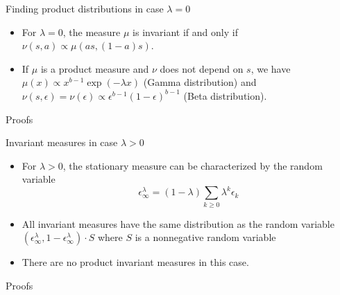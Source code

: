 \documentclass[9pt]{beamer}
\begin{document}
\begin{frame}{Finding product distributions in case $\lambda = 0$}
\begin{itemize}
    \item For $\lambda = 0$, the measure $\mu$ is invariant if and only if $\nu(s, a) \propto \mu(as, (1-a)s)$.
    \item If $\mu$ is a product measure and $\nu$ does not depend on $s$, we have $\mu(x) \propto x^{b-1} \exp(-\lambda x)$ (Gamma distribution) and $\nu(s, \epsilon) = \nu(\epsilon) \propto \epsilon^{b-1}(1-\epsilon)^{b-1}$ (Beta distribution).
\end{itemize}
\end{frame}


\begin{frame}{Proofs}
\end{frame}


\begin{frame}{Invariant measures in case $\lambda > 0$}
\begin{itemize}
    \item For $\lambda > 0$, the stationary measure can be characterized by the random variable
        \[
            \epsilon_{\infty}^{\lambda} = (1-\lambda)\sum_{k \ge 0} \lambda^k \epsilon_k
        \]
    \item All invariant measures have the same distribution as the random variable $(\epsilon_{\infty}^{\lambda}, 1 - \epsilon_{\infty}^{\lambda}) \cdot S$ where $S$ is a nonnegative random variable
    \item There are no product invariant measures in this case.
\end{itemize}
\end{frame}


\begin{frame}{Proofs}
\end{frame}
\end{document}
